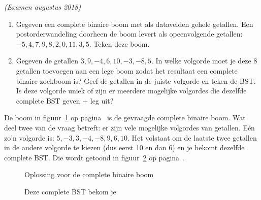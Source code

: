 \begin{oef}
\papier \emph{(Examen augustus 2018)}\\
\begin{enumerate}
\item Gegeven een complete binaire boom met als datavelden gehele getallen. Een postorderwandeling doorheen de boom levert als opeenvolgende getallen: $-5, 4, 7, 9, 8, 2, 0, 11, 3, 5$. Teken deze boom.

\item Gegeven de getallen $3, 9, -4, 6, 10, -3, -8, 5$. In welke volgorde moet je deze 8 getallen toevoegen aan een lege boom zodat het resultaat een complete binaire zoekboom is? Geef de getallen in de juiste volgorde en teken de BST. Is deze volgorde uniek of zijn er meerdere mogelijke volgordes die dezelfde complete BST geven + leg uit?
\end{enumerate}
\begin{opl}
De boom in figuur~\ref{fig:aug18opl} op pagina~\pageref{fig:aug18opl} is de gevraagde complete binaire boom. Wat deel twee van de vraag betreft: er zijn vele mogelijke volgordes van getallen. Eén zo'n volgorde is: $5, -3, 3, -4, -8, 9, 6, 10$. Het volstaat om de laatste twee getallen in de andere volgorde te kiezen (dus eerst 10 en dan 6) en je bekomt dezelfde complete BST. Die wordt getoond in figuur~\ref{fig:aug18bopl} op pagina~\pageref{fig:aug18bopl}.
\begin{figure}[htbp]
    \centering
{}
\caption{Oplossing voor de complete binaire boom}
    \label{fig:aug18opl}
\end{figure}
\begin{figure}[htbp]
    \centering
{}
\caption{Deze complete BST bekom je}
    \label{fig:aug18bopl}
\end{figure}
\end{opl}
\end{oef}





